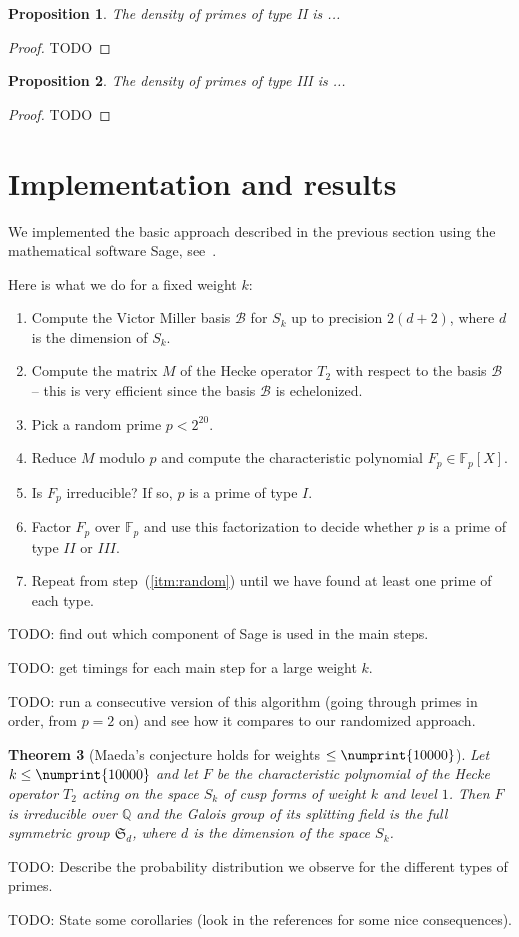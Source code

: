 \documentclass[11pt]{article}
\theoremstyle{plain}
\newtheorem{theorem}{Theorem}[section]
\newtheorem{proposition}[theorem]{Proposition}
\theoremstyle{definition}
\theoremstyle{remark}
\numberwithin{equation}{section}
\numberwithin{table}{section}
\newcommand{\FF}{\mathbb{F}}
\newcommand{\QQ}{\mathbb{Q}}
\newcommand{\cB}{\mathcal{B}}
\renewcommand{\SS}{\mathfrak{S}}
\newcommand{\bound}{\numprint{10000}}
\begin{document}
\begin{proposition}
  The density of primes of type II is ...
\end{proposition}
\begin{proof}
  TODO
\end{proof}

\begin{proposition}
  The density of primes of type III is ...
\end{proposition}
\begin{proof}
  TODO
\end{proof}


\section{Implementation and results}
We implemented the basic approach described in the previous section
using the mathematical software Sage, see~\cite{Sage}.

Here is what we do for a fixed weight $k$:
\begin{enumerate}
  \item Compute the Victor Miller basis $\cB$ for $S_k$ up to precision
    $2(d+2)$, where $d$ is the dimension of $S_k$.
  \item Compute the matrix $M$ of the Hecke operator $T_2$ with respect to the
    basis $\cB$ -- this is very efficient since the basis $\cB$ is
    echelonized.
  \item\label{itm:random} Pick a random prime $p<2^{20}$.
  \item Reduce $M$ modulo $p$ and compute the characteristic polynomial
    $F_p\in \FF_p[X]$.
  \item Is $F_p$ irreducible?  If so, $p$ is a prime of type $I$.
  \item Factor $F_p$ over $\FF_p$ and use this factorization to decide whether
    $p$ is a prime of type $II$ or $III$.
  \item Repeat from step~(\ref{itm:random}) until we have found at
    least one prime of each type.
\end{enumerate}

TODO: find out which component of Sage is used in the main steps.

TODO: get timings for each main step for a large weight $k$.

TODO: run a consecutive version of this algorithm (going through primes in
order, from $p=2$ on) and see how it compares to our randomized approach.

\begin{theorem}[Maeda's conjecture holds for weights $\leq \bound$]
  Let $k\leq \bound$ and let $F$ be the characteristic polynomial of the
  Hecke operator $T_2$ acting on the space $S_k$ of cusp forms of weight
  $k$ and level $1$.  Then $F$ is irreducible over $\QQ$ and the Galois
  group of its splitting field is the full symmetric group $\SS_d$, 
  where $d$ is the dimension of the space $S_k$.
\end{theorem}


TODO: Describe the probability distribution we observe for the different types
of primes.

TODO: State some corollaries (look in the references for some nice
consequences).


\printbibliography
\end{document}
